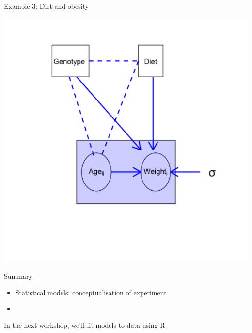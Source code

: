 \documentclass[
  12pt,
  ignorenonframetext,
  aspectratio=169,
]{beamer}
\begin{document}
\begin{frame}{Example 3: Diet and obesity}
\protect\hypertarget{example-3-diet-and-obesity-2}{}

\begin{center}\includegraphics[width=6.67in]{../images/Lecture3_diet} \end{center}

\end{frame}

\begin{frame}{Summary}
\protect\hypertarget{summary}{}

\begin{itemize}
\item
  Statistical models: conceptualisation of experiment
\item
\end{itemize}

\begin{block}{In the next workshop, we'll fit models to data using R}

\end{block}

\end{frame}
\end{document}
